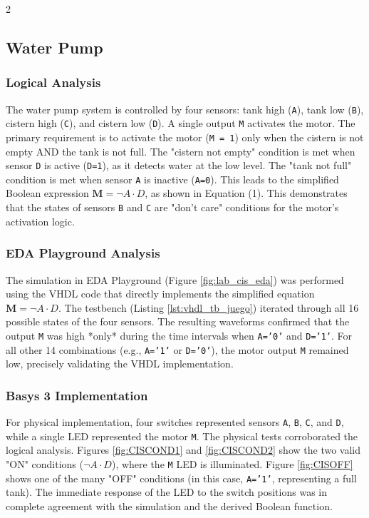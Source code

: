 \documentclass{article}
\begin{document}
\begin{multicols}{2}
\subsection{Water Pump}
\subsubsection{Logical Analysis}
The water pump system is controlled by four sensors: tank high (\texttt{A}), tank low (\texttt{B}), cistern high (\texttt{C}), and cistern low (\texttt{D}). A single output \texttt{M} activates the motor. The primary requirement is to activate the motor (\texttt{M = 1}) only when the cistern is not empty AND the tank is not full. The "cistern not empty" condition is met when sensor \texttt{D} is active (\texttt{D=1}), as it detects water at the low level. The "tank not full" condition is met when sensor \texttt{A} is inactive (\texttt{A=0}). This leads to the simplified Boolean expression $\mathbf{M} = \neg A \cdot D$, as shown in Equation (1). This demonstrates that the states of sensors \texttt{B} and \texttt{C} are "don't care" conditions for the motor's activation logic.

\subsubsection{EDA Playground Analysis}
The simulation in EDA Playground (Figure \ref{fig:lab_cis_eda}) was performed using the VHDL code that directly implements the simplified equation $\mathbf{M} = \neg A \cdot D$. The testbench (Listing \ref{lst:vhdl_tb_juego}) iterated through all 16 possible states of the four sensors. The resulting waveforms confirmed that the output \texttt{M} was high *only* during the time intervals when \texttt{A='0'} and \texttt{D='1'}. For all other 14 combinations (e.g., \texttt{A='1'} or \texttt{D='0'}), the motor output \texttt{M} remained low, precisely validating the VHDL implementation.

\subsubsection{Basys 3 Implementation}
For physical implementation, four switches represented sensors \texttt{A}, \texttt{B}, \texttt{C}, and \texttt{D}, while a single LED represented the motor \texttt{M}. The physical tests corroborated the logical analysis. Figures \ref{fig:CISCOND1} and \ref{fig:CISCOND2} show the two valid "ON" conditions ($\neg A \cdot D$), where the \texttt{M} LED is illuminated. Figure \ref{fig:CISOFF} shows one of the many "OFF" conditions (in this case, \texttt{A='1'}, representing a full tank). The immediate response of the LED to the switch positions was in complete agreement with the simulation and the derived Boolean function.


\end{multicols}
\end{document}

